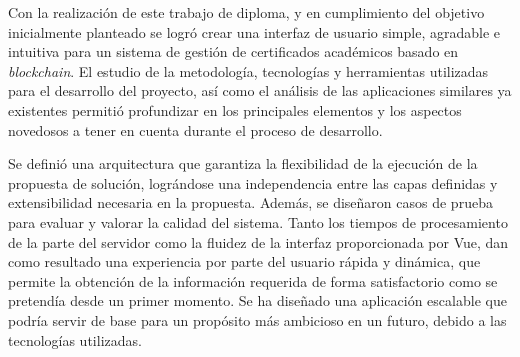 \begin{conclusions}
Con la realización de este trabajo de diploma, y en cumplimiento del objetivo inicialmente planteado se logró crear una interfaz de usuario simple, agradable e intuitiva para un sistema de gestión de certificados académicos basado en \textit{blockchain}. El estudio de la metodología, tecnologías y herramientas utilizadas para el desarrollo del proyecto, así como el análisis de las aplicaciones similares ya existentes permitió profundizar en los principales elementos y los aspectos novedosos a tener en cuenta durante el proceso de desarrollo.



Se definió una arquitectura que garantiza la flexibilidad de la ejecución de la propuesta de solución, lográndose una independencia entre las capas definidas y extensibilidad necesaria en la propuesta. Además, se diseñaron casos de prueba para evaluar y valorar la calidad del sistema. Tanto los tiempos de procesamiento de la parte del servidor como la fluidez de la interfaz proporcionada por Vue, dan como resultado una experiencia por parte del usuario rápida y dinámica, que permite la obtención de la información requerida de forma satisfactorio como se pretendía desde un primer momento. Se ha diseñado una aplicación escalable que podría servir de base para un propósito más ambicioso en un futuro, debido a las tecnologías utilizadas.


\end{conclusions}
